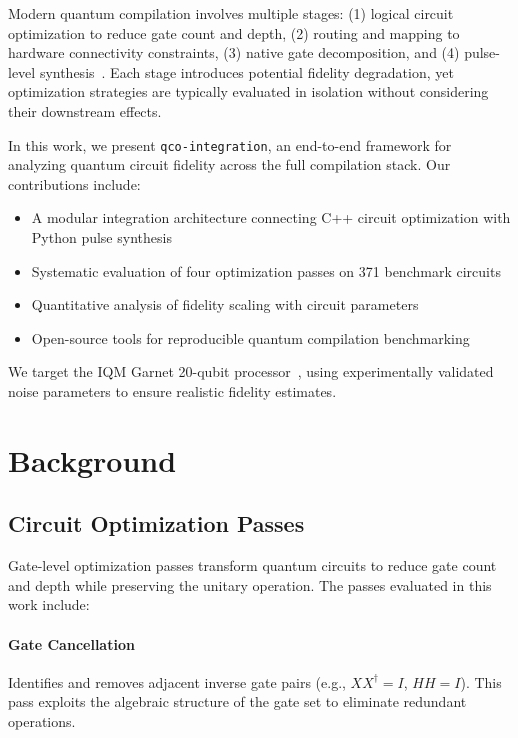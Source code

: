 \documentclass[twocolumn,showpacs,preprintnumbers,amsmath,amssymb,prb]{revtex4-2}
\begin{document}
Modern quantum compilation involves multiple stages: (1) logical circuit optimization to reduce gate count and depth, (2) routing and mapping to hardware connectivity constraints, (3) native gate decomposition, and (4) pulse-level synthesis~\cite{shi2019optimized}. Each stage introduces potential fidelity degradation, yet optimization strategies are typically evaluated in isolation without considering their downstream effects.

In this work, we present \texttt{qco-integration}, an end-to-end framework for analyzing quantum circuit fidelity across the full compilation stack. Our contributions include:

\begin{itemize}
    \item A modular integration architecture connecting C++ circuit optimization with Python pulse synthesis
    \item Systematic evaluation of four optimization passes on 371 benchmark circuits
    \item Quantitative analysis of fidelity scaling with circuit parameters
    \item Open-source tools for reproducible quantum compilation benchmarking
\end{itemize}

We target the IQM Garnet 20-qubit processor~\cite{iqm2024garnet}, using experimentally validated noise parameters to ensure realistic fidelity estimates.

\section{Background}
\label{sec:background}

\subsection{Circuit Optimization Passes}

Gate-level optimization passes transform quantum circuits to reduce gate count and depth while preserving the unitary operation. The passes evaluated in this work include:

\paragraph{Gate Cancellation} Identifies and removes adjacent inverse gate pairs (e.g., $XX^{\dagger} = I$, $HH = I$). This pass exploits the algebraic structure of the gate set to eliminate redundant operations.
\end{document}
